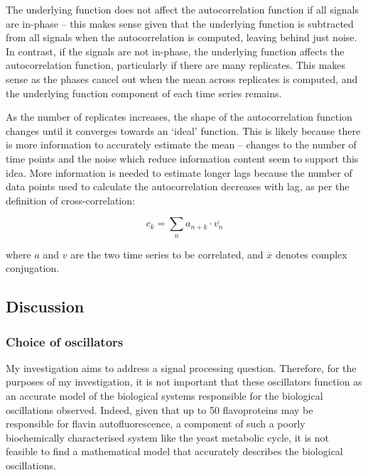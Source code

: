 \begin{enumerate}
\begin{enumerate}
The underlying function does not affect the autocorrelation function if all signals are in-phase -- this makes sense given that the underlying function is subtracted from all signals when the autocorrelation is computed, leaving behind just noise.  In contrast, if the signals are not in-phase, the underlying function affects the autocorrelation function, particularly if there are many replicates.  This makes sense as the phases cancel out when the mean across replicates is computed, and the underlying function component of each time series remains.

As the number of replicates increases, the shape of the autocorrelation function changes until it converges towards an `ideal' function.  This is likely because there is more information to accurately estimate the mean -- changes to the number of time points and the noise which reduce information content seem to support this idea.  More information is needed to estimate longer lags because the number of data points used to calculate the autocorrelation decreases with lag, as per the definition of cross-correlation:

\begin{equation}
c_{k} = \sum_{n} a_{n+k} \cdot \overline{v_n}
\end{equation}

where \(a\) and \(v\) are the two time series to be correlated, and \(\overline{x}\) denotes complex conjugation.
\end{enumerate}
\end{enumerate}

\subsection{Discussion}
\label{sec:analysis-correlation-discussion}

\subsubsection{Choice of oscillators}
\label{sec:analysis-correlation-discussion-osc}

My investigation aims to address a signal processing question.  Therefore, for the purposes of my investigation, it is not important that these oscillators function as an accurate model of the biological systems responsible for the biological oscillations observed.  Indeed, given that up to 50 flavoproteins may be responsible for flavin autofluorescence, a component of such a poorly biochemically characterised system like the yeast metabolic cycle, it is not feasible to find a mathematical model that accurately describes the biological oscillations.

